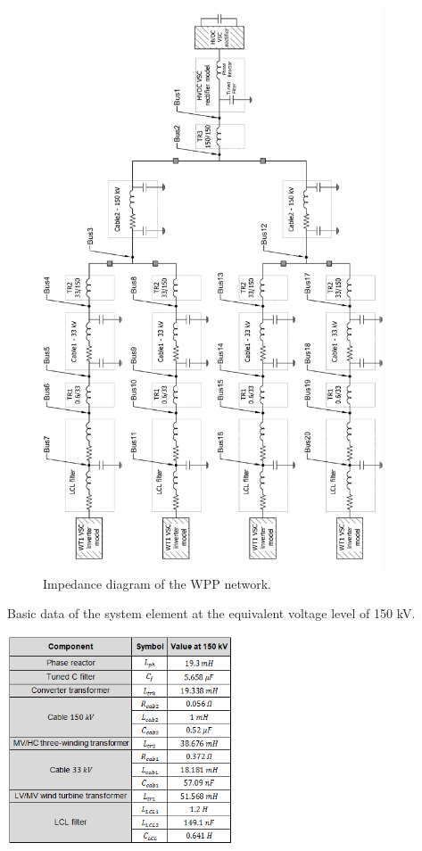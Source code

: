 \documentclass[12pt]{report} %
\begin{document}
\begin{figure}[htb]
	\centering
	\includegraphics[width=0.9\textwidth]{img/Case3/system_case3.png}
  	\caption{Impedance diagram of the WPP network.}
  	\label{fig:systemcase3}
\end{figure}
\FloatBarrier

\begin{table}[htb]
	\centering
	\caption{Basic data of the system element at the equivalent voltage level of 150 kV.}
	\includegraphics[width=0.5\textwidth]{img/table_systemdata.png}
  	\label{tab:systemdata}
\end{table}
\FloatBarrier
\end{document}
